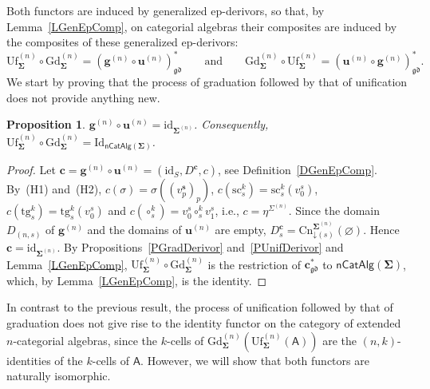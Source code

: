 \documentclass{amsart}
\newcommand{\vs}[1]{\mathbin{\downarrow}#1}
\theoremstyle{plain}
\newtheorem{proposition}[theorem]{Proposition}
\theoremstyle{definition}
\begin{document}
Both functors are induced by generalized ep-derivors, so that, by Lemma~\ref{LGenEpComp}, on categorial algebras their composites are induced by the composites of these generalized ep-derivors:
$$
\mathrm{Uf}^{(n)}_{\mathbf{\Sigma}}\circ\mathrm{Gd}^{(n)}_{\mathbf{\Sigma}}=(\mathbf{g}^{(n)}\circ\mathbf{u}^{(n)})^{\ast}_{\mathfrak{gd}}
\qquad\text{and}\qquad
\mathrm{Gd}^{(n)}_{\mathbf{\Sigma}}\circ\mathrm{Uf}^{(n)}_{\mathbf{\Sigma}}=(\mathbf{u}^{(n)}\circ\mathbf{g}^{(n)})^{\ast}_{\mathfrak{gd}}.
$$
We start by proving that the process of graduation followed by that of unification does not provide anything new.

\begin{proposition}\label{PUnifGrad}
$\mathbf{g}^{(n)}\circ\mathbf{u}^{(n)}=\mathrm{id}_{\mathbf{\Sigma}^{(n)}}$. Consequently, $\mathrm{Uf}^{(n)}_{\mathbf{\Sigma}}\circ\mathrm{Gd}^{(n)}_{\mathbf{\Sigma}}=\mathrm{Id}_{\mathsf{nCatAlg}(\mathbf{\Sigma})}$.
\end{proposition}
\begin{proof}
Let $\mathbf{c}=\mathbf{g}^{(n)}\circ\mathbf{u}^{(n)}=(\mathrm{id}_{S},D^{\mathbf{c}},c)$, see Definition~\ref{DGenEpComp}. By~(H1) and~(H2), $c(\sigma)=\sigma((v^{\mathbf{s}}_{p})_{p})$, $c(\mathrm{sc}^{k}_{s})=\mathrm{sc}^{k}_{s}(v^{s}_{0})$, $c(\mathrm{tg}^{k}_{s})=\mathrm{tg}^{k}_{s}(v^{s}_{0})$ and $c(\circ^{k}_{s})=v^{s}_{0}\circ^{k}_{s}v^{s}_{1}$, i.e., $c=\eta^{\Sigma^{(n)}}$. Since the domain $D_{(n,s)}$ of $\mathbf{g}^{(n)}$ and the domains of $\mathbf{u}^{(n)}$ are empty, $D^{\mathbf{c}}_{s}=\mathrm{Cn}^{\mathbf{\Sigma}^{(n)}}_{\vs{(s)}}(\varnothing)$. Hence $\mathbf{c}=\mathrm{id}_{\mathbf{\Sigma}^{(n)}}$. By Propositions~\ref{PGradDerivor} and~\ref{PUnifDerivor} and Lemma~\ref{LGenEpComp}, $\mathrm{Uf}^{(n)}_{\mathbf{\Sigma}}\circ\mathrm{Gd}^{(n)}_{\mathbf{\Sigma}}$ is the restriction of $\mathbf{c}^{\ast}_{\mathfrak{gd}}$ to $\mathsf{nCatAlg}(\mathbf{\Sigma})$, which, by Lemma~\ref{LGenEpComp}, is the identity.
\end{proof}

In contrast to the previous result, the process of unification followed by that of graduation does not give rise to the identity functor on the category of extended $n$-categorial algebras, since the $k$-cells of $\mathrm{Gd}^{(n)}_{\mathbf{\Sigma}}(\mathrm{Uf}^{(n)}_{\mathbf{\Sigma}}(\boldsymbol{\mathsf{A}}))$ are the $(n,k)$-identities of the $k$-cells of $\boldsymbol{\mathsf{A}}$. However, we will show that both functors are naturally isomorphic.
\end{document}
